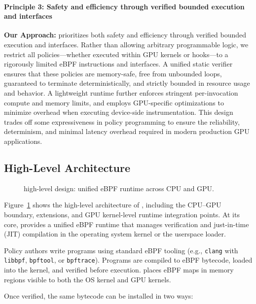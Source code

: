 \paragraph{Principle 3: Safety and efficiency through verified bounded execution and interfaces}
\noindent\textbf{Our Approach:} \sys prioritizes both safety and efficiency through verified bounded execution and interfaces. Rather than allowing arbitrary programmable logic, we restrict all policies—whether executed within GPU kernels or \sysdriver hooks—to a rigorously limited eBPF instructions and interfaces. A unified static verifier ensures that these policies are memory-safe, free from unbounded loops, guaranteed to terminate deterministically, and strictly bounded in resource usage and behavior. A lightweight runtime further enforces stringent per-invocation compute and memory limits, and employs GPU-specific optimizations to minimize overhead when executing device-side instrumentation. This design trades off some expressiveness in policy programming to ensure the reliability, determinism, and minimal latency overhead required in modern production GPU applications.

\subsection{High-Level Architecture}
\label{sec:arch}

\begin{figure}
\centering
{}
\vspace{-.5ex}
\caption{\sys high-level design: unified eBPF runtime across CPU and GPU.}
\label{fig:system-design}
\end{figure}

Figure~\ref{fig:system-design} shows the high-level architecture of \sys, including the CPU--GPU boundary, \sysdriver extensions, and GPU kernel-level runtime integration points. At its core, \sys provides a unified eBPF runtime that manages verification and just-in-time (JIT) compilation in the operating system kernel or the userspace loader.

Policy authors write \sys programs using standard eBPF tooling (e.g., \texttt{clang} with \texttt{libbpf}, \texttt{bpftool}, or \texttt{bpftrace}). Programs are compiled to eBPF bytecode, loaded into the kernel, and verified before execution. \sys places eBPF maps in memory regions visible to both the OS kernel and GPU kernels.

Once verified, the same bytecode can be installed in two ways:


